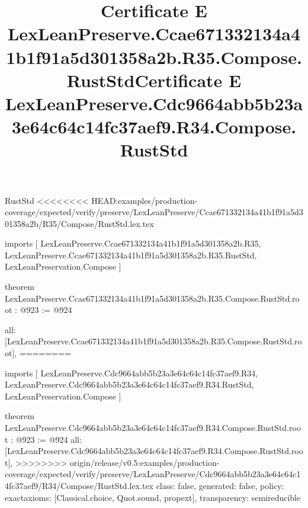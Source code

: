 \begin{lexlean}{RustStd}
<<<<<<<< HEAD:examples/production-coverage/expected/verify/preserve/LexLeanPreserve/Ccae671332134a41b1f91a5d301358a2b/R35/Compose/RustStd.lex.tex
\title{Certificate E LexLeanPreserve.Ccae671332134a41b1f91a5d301358a2b.R35.Compose.RustStd}
\begin{coremodule}
imports [
  LexLeanPreserve.Ccae671332134a41b1f91a5d301358a2b.R35,
  LexLeanPreserve.Ccae671332134a41b1f91a5d301358a2b.R35.RustStd,
  LexLeanPreservation.Compose
]

theorem LexLeanPreserve.Ccae671332134a41b1f91a5d301358a2b.R35.Compose.RustStd.root : @923 := @924 {
  all: [LexLeanPreserve.Ccae671332134a41b1f91a5d301358a2b.R35.Compose.RustStd.root],
========
\title{Certificate E LexLeanPreserve.Cdc9664abb5b23a3e64c64c14fc37aef9.R34.Compose.RustStd}
\begin{coremodule}
imports [
  LexLeanPreserve.Cdc9664abb5b23a3e64c64c14fc37aef9.R34,
  LexLeanPreserve.Cdc9664abb5b23a3e64c64c14fc37aef9.R34.RustStd,
  LexLeanPreservation.Compose
]

theorem LexLeanPreserve.Cdc9664abb5b23a3e64c64c14fc37aef9.R34.Compose.RustStd.root : @923 := @924 {
  all: [LexLeanPreserve.Cdc9664abb5b23a3e64c64c14fc37aef9.R34.Compose.RustStd.root],
>>>>>>>> origin/release/v0.5:examples/production-coverage/expected/verify/preserve/LexLeanPreserve/Cdc9664abb5b23a3e64c64c14fc37aef9/R34/Compose/RustStd.lex.tex
  class: false,
  generated: false,
  policy: exact{axioms: [Classical.choice, Quot.sound, propext]},
  transparency: semireducible
}


\end{coremodule}}
\end{coremodule}
\end{lexlean}

